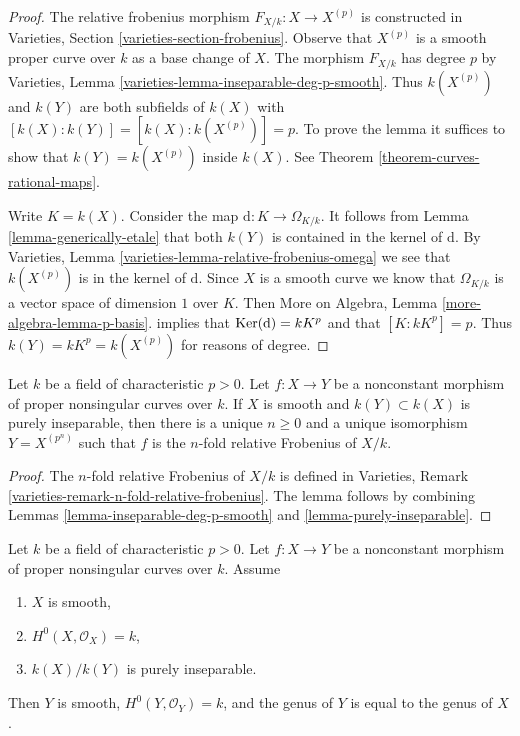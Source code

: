 \begin{proof}
The relative frobenius morphism $F_{X/k} : X \to X^{(p)}$
is constructed in Varieties, Section \ref{varieties-section-frobenius}.
Observe that $X^{(p)}$ is a smooth proper curve over $k$
as a base change of $X$. The morphism $F_{X/k}$ has degree $p$ by
Varieties, Lemma \ref{varieties-lemma-inseparable-deg-p-smooth}.
Thus $k(X^{(p)})$ and $k(Y)$ are both subfields of $k(X)$
with $[k(X) : k(Y)] = [k(X) : k(X^{(p)})] = p$. To prove the lemma
it suffices to show that $k(Y) = k(X^{(p)})$ inside $k(X)$. See
Theorem \ref{theorem-curves-rational-maps}.

\medskip\noindent
Write $K = k(X)$. Consider the map $\text{d} : K \to \Omega_{K/k}$.
It follows from Lemma \ref{lemma-generically-etale}
that both $k(Y)$ is contained in the
kernel of $\text{d}$. By
Varieties, Lemma \ref{varieties-lemma-relative-frobenius-omega}
we see that $k(X^{(p)})$ is in the kernel of $\text{d}$.
Since $X$ is a smooth curve we know that $\Omega_{K/k}$
is a vector space of dimension $1$ over $K$.
Then More on Algebra, Lemma \ref{more-algebra-lemma-p-basis}.
implies that $\mathop{\mathrm{Ker}}(\text{d}) = kK^p$ and
that $[K : kK^p] = p$.
Thus $k(Y) = kK^p = k(X^{(p)})$ for reasons of degree.
\end{proof}

\begin{lemma}
\label{lemma-purely-inseparable-smooth}
Let $k$ be a field of characteristic $p > 0$. Let $f : X \to Y$ be a
nonconstant morphism of proper nonsingular curves over $k$.
If $X$ is smooth and $k(Y) \subset k(X)$ is purely inseparable,
then there is a unique $n \geq 0$ and a unique isomorphism $Y = X^{(p^n)}$
such that $f$ is the $n$-fold relative Frobenius of $X/k$.
\end{lemma}

\begin{proof}
The $n$-fold relative Frobenius of $X/k$ is defined in
Varieties, Remark \ref{varieties-remark-n-fold-relative-frobenius}.
The lemma follows by combining Lemmas \ref{lemma-inseparable-deg-p-smooth}
and \ref{lemma-purely-inseparable}.
\end{proof}

\begin{lemma}
\label{lemma-purely-inseparable-smooth-genus}
Let $k$ be a field of characteristic $p > 0$. Let $f : X \to Y$ be a
nonconstant morphism of proper nonsingular curves over $k$.
Assume
\begin{enumerate}
\item $X$ is smooth,
\item $H^0(X, \mathcal{O}_X) = k$,
\item $k(X)/k(Y)$ is purely inseparable.
\end{enumerate}
Then $Y$ is smooth, $H^0(Y, \mathcal{O}_Y) = k$, and the genus of $Y$
is equal to the genus of $X$.
\end{lemma}

